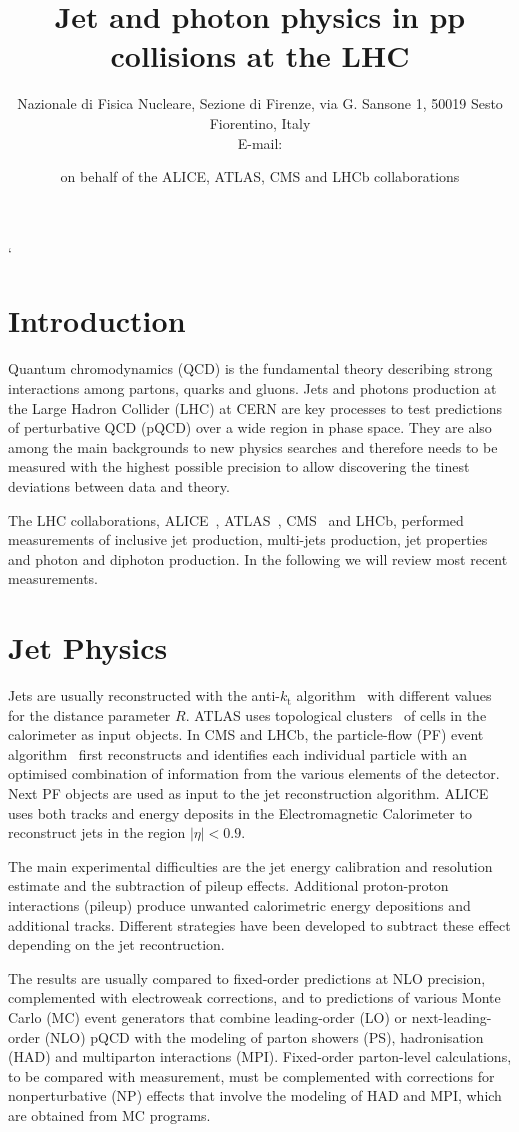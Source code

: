 \documentclass{PoS}
\title{Jet and photon physics in pp collisions at the LHC}
\author{\speaker{ Vitaliano Ciulli }%
Nazionale di Fisica Nucleare, Sezione di Firenze, via G. Sansone 1, 50019 Sesto Fiorentino, Italy \\ E-mail:
\email{vitaliano.ciulli@fi.infn.it}} \author{on behalf of the ALICE, ATLAS, CMS and LHCb collaborations}
\providecommand{\kts}{\ensuremath{k_{\mathrm{t}}}\xspace}
\begin{document}
`
\section{Introduction}

Quantum chromodynamics (QCD) is the fundamental theory describing strong interactions among partons, \ie quarks and
gluons. Jets and photons production at the Large Hadron Collider (LHC) at CERN are key processes to test predictions of
perturbative QCD (pQCD) over a wide region in phase space. They are also among the main backgrounds to new physics
searches and therefore needs to be measured with the highest possible precision to allow discovering the tinest
deviations between data and theory.

The LHC collaborations, ALICE~, ATLAS~\cite{Aad:2008zzm}, CMS~\cite{Chatrchyan:2008aa} and LHCb, performed
measurements of inclusive jet production, multi-jets production, jet properties and photon and diphoton production. 
In the following we will review most recent measurements.

\section{Jet Physics}

Jets are usually reconstructed with the anti-\kts algorithm~\cite{Cacciari:2008gp} with different values for the distance parameter $R$.
ATLAS uses topological clusters~\cite{Lampl:2008zz} of cells in the calorimeter as input objects. 
In CMS and LHCb, the particle-flow (PF) event algorithm~\cite{CMS:2009nxa}
first reconstructs and identifies each individual particle with an optimised
combination of information from the various elements of the detector. Next PF objects are used as input to the jet
reconstruction algorithm. ALICE uses both tracks and energy deposits in the
Electromagnetic Calorimeter to reconstruct jets in the region $|\eta|<0.9$.

The main experimental difficulties are the jet energy calibration and resolution estimate and the subtraction of pileup
effects. Additional proton-proton interactions (pileup) produce unwanted calorimetric energy depositions and additional
tracks. Different strategies have been developed to subtract these effect depending on the jet recontruction.

The results are usually compared to fixed-order predictions at NLO precision, complemented with electroweak corrections, and to predictions of
various Monte Carlo (MC) event generators that combine leading-order (LO) or next-leading-order (NLO) pQCD with the modeling of parton
showers (PS), hadronisation (HAD) and multiparton interactions (MPI).
Fixed-order parton-level calculations, to be compared with measurement, must be complemented with corrections for nonperturbative
(NP) effects that involve the modeling of HAD and MPI, which are obtained from MC programs. 
\end{document}
